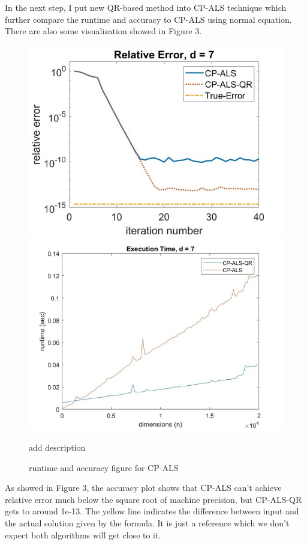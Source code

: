 \documentclass{article}
\begin{document}
In the next step, I put new QR-based method into CP-ALS technique which further compare the runtime and accuracy to 
CP-ALS using normal equation. There are also some visualization showed in Figure $3$.

\begin{figure}[ht!]
  \begin{center}
    \includegraphics*[scale = 0.3]{accuracy.jpeg}
    \includegraphics*[scale = 0.3]{runtime.jpeg}
    \caption[Figure]{runtime and accuracy figure for CP-ALS}
  \end{center}
add description
\end{figure}

As showed in Figure $3$,
the accuracy plot shows that CP-ALS can't achieve relative error much below the square root 
of machine precision, but CP-ALS-QR gets to around 1e-13. The yellow line indicates the difference
between input and the actual solution given by the formula. It is just a reference which we don't
expect both algorithms will get close to it.
\end{document}
